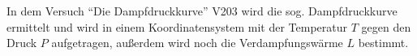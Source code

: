 In dem Versuch \enquote{Die Dampfdruckkurve} V203 wird die sog. Dampfdruckkurve ermittelt
und wird in einem Koordinatensystem mit der Temperatur $T$ gegen den Druck $P$ aufgetragen,
außerdem wird noch die Verdampfungswärme $L$ bestimmt.
